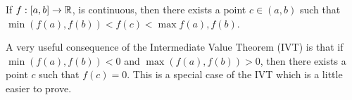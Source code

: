 \documentclass[12pt]{article}
\theoremstyle{definition}
\begin{document}
        \begin{theorem}
            If $f: [a, b] \rightarrow \R$, is continuous, then there exists a point $c \in (a, b)$ such that $\min(f(a), f(b)) < f(c) < \max{f(a), f(b)}$. 
        \end{theorem}
        \begin{corollary}
            A very useful consequence of the Intermediate Value Theorem (IVT) is that if $\min(f(a), f(b)) < 0$ and $\max(f(a), f(b)) > 0$, then there exists a point $c$ such that $f(c) = 0$. This is a special case of the IVT which is a little easier to prove.
        \end{corollary}
\end{document}
